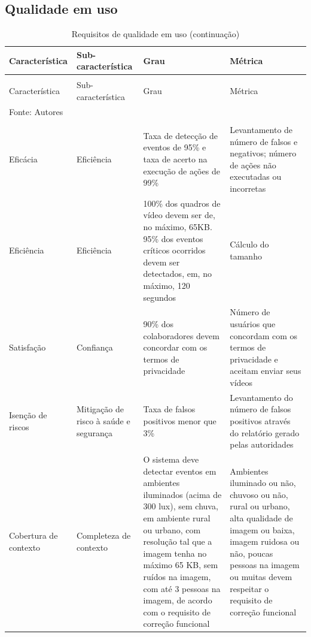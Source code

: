 \documentclass[]{politex}
\begin{document}
\subsection{Qualidade em uso}
\begin{center}
\begin{longtable}{m{3cm} | m{4cm} | m{4cm} | m{4cm}} 
\caption{\label{tab:qualidade_em_uso}Requisitos de qualidade em uso}\\
\hline\hline
Característica & Sub-característica & Grau & Métrica \\
\hline
\endfirsthead
\caption[]{Requisitos de qualidade em uso (continuação)} \\
\hline
Característica & Sub-característica & Grau & Métrica \\
\hline
\endhead
\hline\hline
\multicolumn{4}{l}{Fonte: Autores} \\
\endlastfoot
\hline
\multicolumn{4}{r}{\footnotesize{}continua na próxima página} \\
\endfoot
Eficácia & Eficiência & Taxa de detecção de eventos de 95\% e taxa de acerto na execução de ações de 99\% & Levantamento de número de falsos e negativos; número de ações não executadas ou incorretas \\ 
\hline
Eficiência & Eficiência & 100\% dos quadros de vídeo devem ser de, no máximo, 65KB. 95\% dos eventos críticos ocorridos devem ser detectados, em, no máximo, 120 segundos & Cálculo do tamanho \\
\hline
Satisfação & Confiança & 90\% dos colaboradores devem concordar com os termos de privacidade & Número de usuários que concordam com os termos de privacidade e aceitam enviar seus vídeos\\
\hline
Isenção de riscos & Mitigação de risco à saúde e segurança & Taxa de falsos positivos menor que 3\% & Levantamento do número de falsos positivos através do relatório gerado pelas autoridades \\
\hline
Cobertura de contexto & Completeza de contexto & O sistema deve detectar eventos em ambientes iluminados (acima de 300 lux), sem chuva, em ambiente rural ou urbano, com resolução tal que a imagem tenha no máximo 65 KB, sem ruídos na imagem, com até 3 pessoas na imagem, de acordo com o requisito de correção funcional & Ambientes iluminado ou não, chuvoso ou não, rural ou urbano, alta qualidade de imagem ou baixa, imagem ruidosa ou não, poucas pessoas na imagem ou muitas devem respeitar o requisito de correção funcional \\
\end{longtable}
\end{center}
\end{document}
